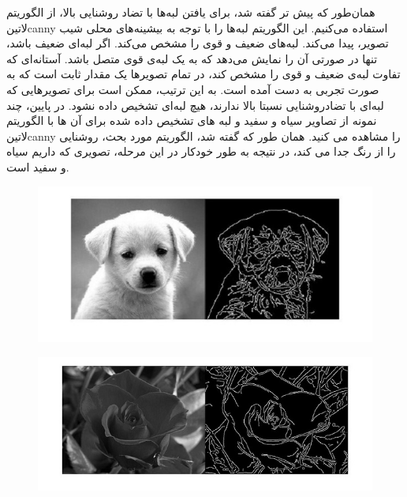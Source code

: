  همان‌طور که پیش تر گفته شد، برای یافتن لبه‌ها با تضاد روشنایی بالا، از الگوریتم 
  ‌لاتین{canny }
 استفاده می‌کنیم.
 این الگوریتم لبه‌ها را با توجه به بیشینه‌های محلی شیب تصویر، پیدا می‌کند. لبه‌های ضعیف و قوی را مشخص می‌کند. اگر لبه‌ای ضعیف باشد، تنها در صورتی آن را نمایش می‌دهد که به یک لبه‌ی قوی متصل باشد. آستانه‌ای که تفاوت لبه‌ی ضعیف و قوی را مشخص کند، در تمام تصویر‌ها یک مقدار ثابت است که به صورت تجربی به دست آمده است. به این ترتیب، ممکن است برای تصویر‌هایی که لبه‌ای با تضادروشنایی نسبتا بالا ندارند، هیچ لبه‌ای تشخیص داده نشود.
 در پایین، چند نمونه از تصاویر سیاه و سفید و لبه های تشخیص داده شده برای آن ها با الگوریتم 
   ‌لاتین{canny }
 را مشاهده می کنید. همان طور که گفته شد، الگوریتم مورد بحث، روشنایی را از رنگ جدا می کند، در نتیجه به طور خودکار در این مرحله، تصویری که داریم سیاه و سفید است.
  \begin{figure}[!htb]

  		\includegraphics[width=\linewidth]{images/cannyexample1}

  		\caption{}\label{fig:logtonemap}

  		\endminipage\hfill

  \end{figure}
  
   
   \begin{figure}[!htb]

   		\includegraphics[width=\linewidth]{images/cannyexample2}

   		\caption{}\label{fig:logtonemap}

   		\endminipage\hfill

   \end{figure}
   
